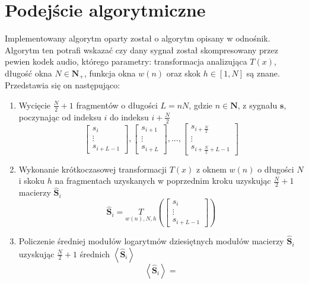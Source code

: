 \documentclass[pl,12pt]{aghdpl}
\let\Oldsection\section%
\renewcommand{\section}{\FloatBarrier\Oldsection}
\begin{document}
\section{Podejście algorytmiczne}
Implementowany algorytm oparty został o algorytm opisany w
{\color{red}odnośnik}. Algorytm ten potrafi wskazać czy dany sygnał został
skompresowany przez pewien kodek audio, którego parametry: transformacja
analizująca $T(x)$, długość okna $N \in \bm N_+$, funkcja okna $w(n)$ oraz skok
$h \in \left[1, N\right]$ są znane.
Przedstawia się on następująco:
\begin{enumerate}
  \item Wycięcie $\frac{N}{2}+1$ fragmentów o długości $L = nN$, gdzie $n \in
    \bm N$, z sygnału $\bm s$,
    poczynając od indeksu $i$ do indeksu $i+\frac{N}{2}$
    \begin{equation}
      \begin{bmatrix}
        s_i \\\vdots\\ s_{i+L-1}
      \end{bmatrix},
      \begin{bmatrix}
        s_{i+1} \\\vdots\\ s_{i+L}
      \end{bmatrix}, \dotsc,
      \begin{bmatrix}
        s_{i+\frac{N}{2}} \\\vdots\\ s_{i+\frac{N}{2}+L-1}
      \end{bmatrix}
    \end{equation}
  \item Wykonanie krótkoczasowej transformacji $T(x)$ z oknem $w(n)$ o długości
    $N$ i skoku $h$ na fragmentach uzyskanych w poprzednim kroku uzyskując
    $\frac{N}{2}+1$ macierzy $\hat{\bm S}_i$
    \begin{equation}
      \hat{\bm S}_i = \underset{w(n), N, h}{T}\left(
        \begin{bmatrix}
          s_i \\\vdots\\ s_{i+L-1}
        \end{bmatrix}\right)
    \end{equation}
  \item Policzenie średniej modułów logarytmów dziesiętnych modułów macierzy
    $\hat{\bm S}_i$ uzyskując $\frac{N}{2}+1$ średnich $\left<\hat{\bm S}_i\right>$
    \begin{equation}
      \left<\hat{\bm S}_i\right> =

\end{equation}
\end{enumerate}
\end{document}
